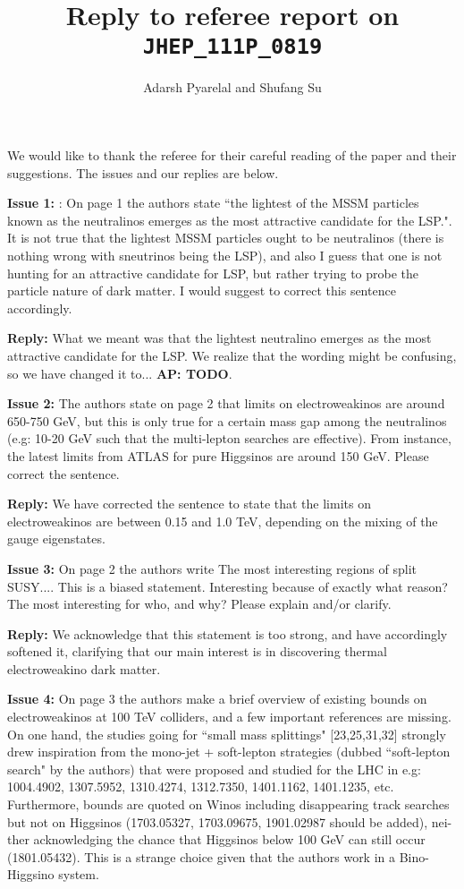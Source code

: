 \documentclass[12pt]{article}
\title{Reply to referee report on \texttt{JHEP\_111P\_0819}}
\author{Adarsh Pyarelal and Shufang Su}
\newcommand{\Adarsh}[1]{{\bf\color{RoyalBlue} AP: #1}}
\newcommand{\issue}[1]{\bigskip\noindent\textbf{\color{Maroon}Issue #1: }}
\newcommand{\reply}{\medskip\noindent\textbf{\color{RoyalBlue}Reply:}}
\begin{document}
\maketitle

We would like to thank the referee for their careful reading of the paper and their 
suggestions. The issues and our replies are below.

 \issue{1}: On page 1 the authors state ``the lightest of the
MSSM particles known as the neutralinos emerges as the most attractive
candidate for the LSP.". It is not true that the lightest MSSM particles ought
to be neutralinos (there is nothing wrong with sneutrinos being the LSP), and
also I guess that one is not hunting for an attractive candidate for LSP, but
rather trying to probe the particle nature of dark matter. I would suggest to
correct this sentence accordingly.

\reply{} What we meant was that the lightest neutralino
emerges as the most attractive candidate for the LSP. We realize that the
wording might be confusing, so we have changed it to...\Adarsh{TODO}.

 \issue{2} The authors state on page 2 that limits on
electroweakinos are around 650-750 GeV, but this is only true for a certain
mass gap among the neutralinos (e.g: 10-20 GeV such that the multi-lepton
searches are effective). From instance, the latest limits from ATLAS for pure
Higgsinos are around 150 GeV. Please correct the sentence.

\reply{} We have corrected the sentence to state that the
limits on electroweakinos are between 0.15 and 1.0 TeV, depending on the mixing
of the gauge eigenstates.

\issue{3} On page 2 the authors write The most interesting
regions of split SUSY....  This is a biased statement. Interesting because of
exactly what reason? The most interesting for who, and why? Please explain
and/or clarify.

\reply{} We acknowledge that this statement is too
strong, and have accordingly softened it, clarifying that our main interest is
in discovering thermal electroweakino dark matter.

\issue{4} On page 3 the authors make a brief overview of existing bounds on
electroweakinos at 100 TeV colliders, and a few important references are
missing. On one hand, the studies going for ``small mass splittings"
[23,25,31,32] strongly drew inspiration from the mono-jet + soft-lepton
strategies (dubbed ``soft-lepton search" by the authors) that were proposed and
studied for the LHC in e.g: 1004.4902, 1307.5952, 1310.4274, 1312.7350,
1401.1162, 1401.1235, etc. Furthermore, bounds are quoted on Winos including
disappearing track searches but not on Higgsinos (1703.05327, 1703.09675,
1901.02987 should be added), nei- ther acknowledging the chance that Higgsinos
below 100 GeV can still occur (1801.05432). This is a strange choice given that
the authors work in a Bino-Higgsino system.
\end{document}
